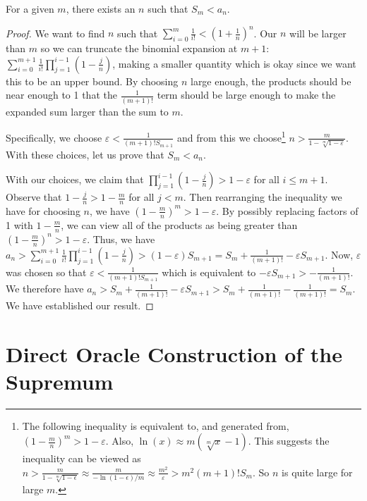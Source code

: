 \documentclass[12pt]{article}
\begin{document}
\begin{lemma}\label{lem:snam}
For a given $m$, there exists an $n$ such that $S_m < a_n$.   
\end{lemma}

\begin{proof}
 We want to find $n$ such that $\sum_{i=0}^m \frac{1}{i!} < (1+\frac{1}{n})^n$. Our $n$ will be larger than $m$ so we can truncate the binomial expansion at $m+1$: $\sum_{i=0}^{m+1} \frac{1}{i!} \prod_{j=1}^{i-1} (1-\tfrac{j}{n})$, making a smaller quantity which is okay since we want this to be an upper bound. By choosing $n$ large enough, the products should be near enough to 1 that the $\frac{1}{(m+1)!}$ term should be large enough to make the expanded sum larger than the sum to $m$. 

 Specifically, we choose $\varepsilon < \frac{1}{(m+1)! S_{m+1}  }$ and from this we choose\footnote{The  following inequality is equivalent to, and generated from, $(1-\tfrac{m}{n})^m > 1 - \varepsilon$. Also, $\ln(x) \approx m (\sqrt[m]{x} -1)$. This suggests the inequality can be viewed as $n > \frac{m}{1 - \sqrt[m]{1-\epsilon}} \approx \frac{m}{-\ln(1 - \epsilon)/m} \approx \frac{m^2}{\varepsilon} > m^2 (m+1)! S_m$. So $n$ is quite large for large $m$.}  $n > \frac{m}{ 1 - \sqrt[m]{1-\varepsilon}}$. With these choices, let us prove that $S_m < a_n$. 
 
 With our choices, we claim that $\prod_{j=1}^{i-1} (1-\tfrac{j}{n}) > 1-\varepsilon$ for all $i \leq m+1$. Observe that $1-\tfrac{j}{n} > 1 -\tfrac{m}{n}$ for all $j < m$. Then rearranging the inequality we have for choosing $n$, we have $(1 - \tfrac{m}{n})^m > 1 - \varepsilon $. By possibly replacing factors of 1 with $1-\tfrac{m}{n}$, we can view all of the products as being greater than $(1 - \tfrac{m}{n})^n > 1-\varepsilon$.  Thus, we have 
 $a_n >  \sum_{i=0}^{m+1} \frac{1}{i!} \prod_{j=1}^{i-1} (1-\tfrac{j}{n}) > (1-\varepsilon) S_{m+1} = S_m + \frac{1}{(m+1)!} - \varepsilon S_{m+1}$.  Now, $\varepsilon$ was chosen so that $\varepsilon < \frac{1}{(m+1)! S_{m+1}}$ which is equivalent to $- \varepsilon S_{m+1} > -\frac{1}{(m+1)!}$. We therefore have $a_n > S_m + \frac{1}{(m+1)!} - \varepsilon S_{m+1} > S_m + \frac{1}{(m+1)!} - \frac{1}{(m+1)!} = S_m$. We have established our result. 
\end{proof}




\section{Direct Oracle Construction of the Supremum}\label{app:sup}
\end{document}
